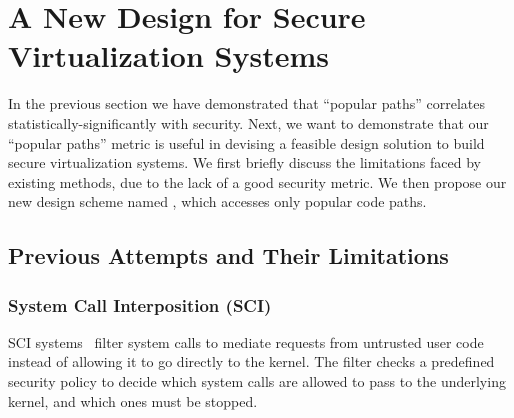 \section{A New Design for Secure Virtualization Systems}
\label{sec.design}


In the previous section we have demonstrated that ``popular paths'' correlates statistically-significantly with security. 
Next, we want to demonstrate that our ``popular paths'' metric is useful in devising a feasible design solution to build 
secure virtualization systems. We first briefly discuss the limitations faced by existing methods, due to the lack of a good 
security metric. We then propose our new design scheme named \lip, which accesses only popular code paths. 

\subsection{Previous Attempts and Their Limitations}

\subsubsection{System Call Interposition (SCI)}
SCI systems~\cite{Janus0:96, Janus:99} filter system calls to mediate requests
from untrusted user code instead of allowing it to go directly to the kernel.
The filter checks a predefined security policy to decide which system calls are
allowed to pass to the underlying kernel, and which ones must be stopped.

